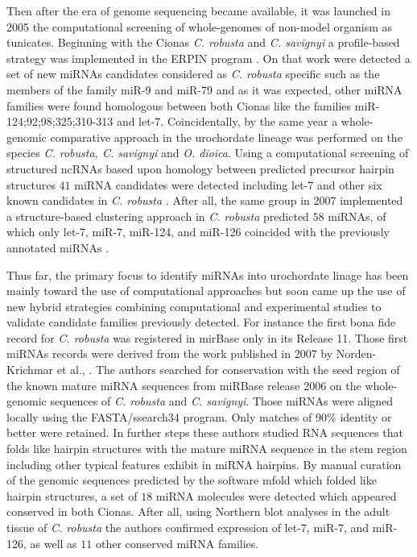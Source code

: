 \documentclass[graybox]{svmult}
\begin{document}
Then after the era of genome sequencing became available, it was launched in 
2005 the computational screening of whole-genomes of non-model organism as 
tunicates. Beginning with the Cionas \textit{C. robusta} and \textit{C. 
savignyi} a profile-based strategy was implemented in the ERPIN program 
\cite{Legendre2005}. On that work were detected a set of new miRNAs candidates 
considered as \textit{C. robusta} specific such as the members of the 
family miR-9 and miR-79 and as it was expected, other miRNA families were found 
homologous between both Cionas like the families miR-124;92;98;325;310-313 and 
let-7. Coincidentally, by the same year a whole-genomic comparative approach in 
the urochordate lineage was performed on the species \textit{C. robusta, C. 
savignyi} and \textit{O. dioica}. Using a computational screening of structured 
ncRNAs based upon homology between predicted precursor hairpin structures  $41$ 
miRNA candidates were detected including let-7 and other six known candidates 
in 
\textit{C. robusta} \cite{Missal2005}. After all, the same group in 2007 
implemented a structure-based clustering approach in \textit{C. robusta} 
predicted $58$ miRNAs, of which only let-7, miR-7, miR-124, and miR-126 
coincided with the previously annotated miRNAs \cite{Will2007}. 

Thus far, the primary focus to identify miRNAs into urochordate linage has been 
mainly toward the use of computational approaches but soon came up the use of 
new hybrid strategies combining computational and experimental studies to 
validate candidate families previously detected. For instance the first bona 
fide record for \textit{C. robusta} was registered in mirBase only in its 
Release 11. Those first miRNAs records were derived from the work published in 
2007 by Norden-Krichmar et al., \cite{Norden-Krichmar2007}. The authors 
searched 
for conservation with the seed region of the known mature miRNA sequences from 
miRBase release 2006 on the whole-genomic sequences of \textit{C. robusta} 
and \textit{C. savignyi}. Those miRNAs were aligned locally using the 
FASTA/ssearch34 program. Only matches of 90\% identity or better were retained. 
In further steps these authors studied RNA sequences that folds like hairpin 
structures with the mature miRNA sequence in the stem region including other 
typical features exhibit in miRNA hairpins. By manual curation of the genomic 
sequences predicted by the software mfold which folded like hairpin structures, 
a set of $18$ miRNA molecules were detected which appeared conserved in both 
Cionas. After all, using  Northern blot analyses in the adult tissue of 
\textit{C. robusta} the authors confirmed expression of  let-7, miR-7, and 
miR-126, as well as $11$ other conserved miRNA families.
\end{document}
